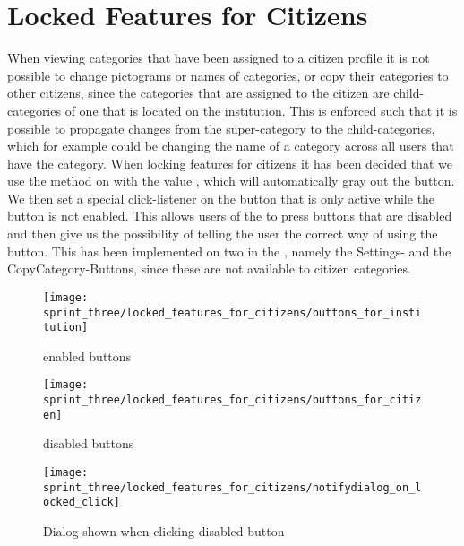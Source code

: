 
\section{Locked Features for Citizens}
\label{sec:locked_features_for_citizens}

When viewing categories that have been assigned to a citizen profile it is not possible to change pictograms or names of categories, or copy their categories to other citizens, since the categories that are assigned to the citizen are child-categories of one that is located on the institution. This is enforced such that it is possible to propagate changes from the super-category to the child-categories, which for example could be changing the name of a category across all users that have the category. When locking features for citizens it has been decided that we use the  method on  with the value , which will automatically gray out the button. We then set a special click-listener on the button that is only active while the button is not enabled. This allows users of the \ct to press buttons that are disabled and then give us the possibility of telling the user the correct way of using the button. This has been implemented on two  in the \ct, namely the Settings- and the CopyCategory-Buttons, since these are not available to citizen categories. 

\begin{figure}[!htbp]
        \centering
        \texttt{[image: sprint\_three/locked\_features\_for\_citizens/buttons\_for\_institution]}
        \caption{\ct enabled buttons}
        \label{fig:ct_enabled_buttons}
\end{figure}

\begin{figure}[!htbp]
        \centering
        \texttt{[image: sprint\_three/locked\_features\_for\_citizens/buttons\_for\_citizen]}
        \caption{\ct disabled buttons}
        \label{fig:ct_disabled_buttons}
\end{figure}

\begin{figure}[!htbp]
        \centering
        \texttt{[image: sprint\_three/locked\_features\_for\_citizens/notifydialog\_on\_locked\_click]}
        \caption{Dialog shown when clicking disabled button}
        \label{fig:notifydialog_on_locked_click}
\end{figure}